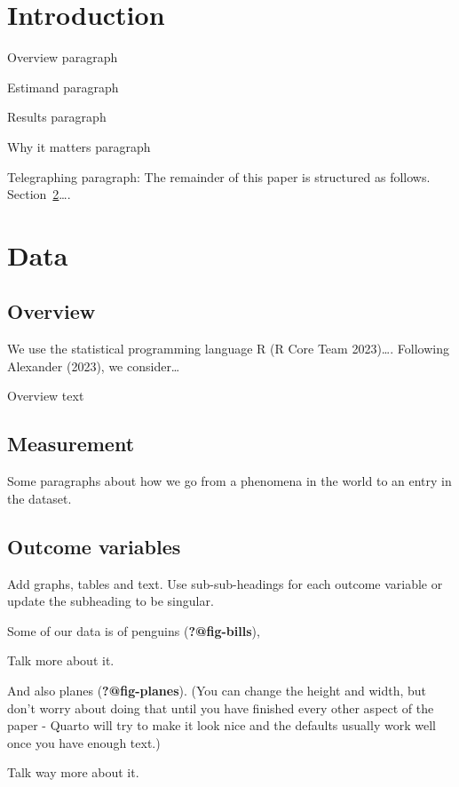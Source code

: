 \documentclass[
  letterpaper,
  DIV=11,
  numbers=noendperiod]{scrartcl}
\begin{document}
\section{Introduction}\label{introduction}

Overview paragraph

Estimand paragraph

Results paragraph

Why it matters paragraph

Telegraphing paragraph: The remainder of this paper is structured as
follows. Section~\ref{sec-data}\ldots.

\section{Data}\label{sec-data}

\subsection{Overview}\label{overview}

We use the statistical programming language R (R Core Team 2023)\ldots.
Following Alexander (2023), we consider\ldots{}

Overview text

\subsection{Measurement}\label{measurement}

Some paragraphs about how we go from a phenomena in the world to an
entry in the dataset.

\subsection{Outcome variables}\label{outcome-variables}

Add graphs, tables and text. Use sub-sub-headings for each outcome
variable or update the subheading to be singular.

Some of our data is of penguins (\textbf{?@fig-bills}),

Talk more about it.

And also planes (\textbf{?@fig-planes}). (You can change the height and
width, but don't worry about doing that until you have finished every
other aspect of the paper - Quarto will try to make it look nice and the
defaults usually work well once you have enough text.)

Talk way more about it.
\end{document}
